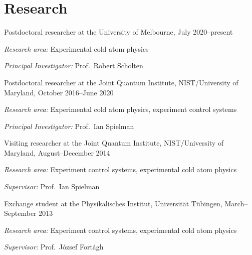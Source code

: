 \documentclass[10pt,a4paper]{article}
\renewenvironment{itemize}{
  \begin{list}{}{
    \setlength{\leftmargin}{1.5em}
    \setlength{\itemsep}{0.25em}
    \setlength{\parskip}{0pt}
    \setlength{\parsep}{0.25em}
  }
}{
  \end{list}
}
\begin{document}
\section*{Research}
\begin{itemize}

\item{Postdoctoral researcher at the University of Melbourne, July 2020--present}
    \begin{itemize}
      \item \textit{Research area:}
      Experimental cold atom physics
      \item \textit{Principal Investigator:}
      Prof.~Robert Scholten
    \end{itemize}

\item{Postdoctoral researcher at the Joint Quantum Institute, NIST/University of Maryland, October 2016--June 2020}
    \begin{itemize}
      \item \textit{Research area:}
      Experimental cold atom physics, experiment control systems
      \item \textit{Principal Investigator:}
      Prof.~Ian Spielman
    \end{itemize}

\item{Visiting researcher at the Joint Quantum Institute, NIST/University of Maryland, August--December 2014}
    \begin{itemize}
      \item \textit{Research area:}
      Experiment control systems, experimental cold atom physics
      \item \textit{Supervisor:}
      Prof.~Ian Spielman
    \end{itemize}

\item{Exchange student at the Physikalisches Institut, Universität Tübingen, March–September 2013}
    \begin{itemize}
      \item \textit{Research area:}
      Experiment control systems, experimental cold atom physics
      \item \textit{Supervisor:}
      Prof.~József Fortágh
    \end{itemize}
    

\end{itemize}
\end{document}
